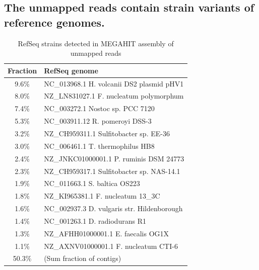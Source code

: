 \documentclass[10pt,a4paper,twocolumn]{article}
\begin{document}


\subsection*{The unmapped reads contain strain variants of reference genomes.}


\begin{table}[t]
\caption{RefSeq strains detected in MEGAHIT assembly of unmapped reads}
\centering
\begin{tabular}{|c|l|}
\hline

\textbf{Fraction}& \textbf{RefSeq genome} \\ [0.5ex] %
\hline

9.6\% & {\small NC\_013968.1 H. volcanii DS2 plasmid pHV1} \\
\hline
8.0\% & {\small NZ\_LN831027.1 F. nucleatum polymorphum} \\
\hline
7.4\% & {\small NC\_003272.1 Nostoc sp. PCC 7120} \\
\hline
5.3\% & {\small NC\_003911.12 R. pomeroyi DSS-3} \\
\hline
3.2\% & {\small NZ\_CH959311.1 Sulfitobacter sp. EE-36} \\
\hline
3.0\% & {\small NC\_006461.1 T. thermophilus HB8} \\
\hline
2.4\% & {\small NZ\_JNKC01000001.1 P. ruminis DSM 24773} \\
\hline
2.3\% & {\small NZ\_CH959317.1 Sulfitobacter sp. NAS-14.1} \\
\hline
1.9\% & {\small NC\_011663.1 S. baltica OS223} \\
\hline
1.8\% & {\small NZ\_KI965381.1 F. nucleatum 13\_3C} \\
\hline
1.6\% & {\small NC\_002937.3 D. vulgaris str. Hildenborough} \\
\hline
1.4\% & {\small NC\_001263.1 D. radiodurans R1} \\
\hline
1.3\% & {\small NZ\_AFHH01000001.1 E. faecalis OG1X} \\
\hline
1.1\% & {\small NZ\_AXNV01000001.1 F. nucleatum CTI-6} \\
\hline

50.3\% & {\small (Sum fraction of contigs)} \\
\hline

\end{tabular}
\label{table:gather}
\end{table}
\end{document}
